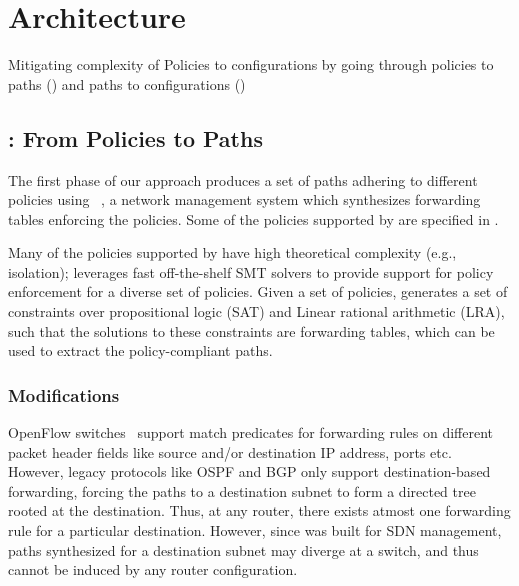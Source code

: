 \section{Architecture} \label{sec:architecture}
Mitigating complexity of Policies to configurations
by going through policies to paths (\genesis) and
paths to configurations (\name)

\subsection{\genesis: From Policies to Paths}
The first phase of our approach produces a set of paths adhering to
different policies using \genesis~\cite{genesis}, a network management
system which synthesizes forwarding tables enforcing the policies. 
Some of the policies supported by \genesis are specified in 
. 

Many of the policies supported by \genesis have high 
theoretical complexity (e.g., isolation); \genesis 
leverages fast off-the-shelf SMT solvers to provide
support for policy enforcement for a diverse set of policies.
Given a set of policies, \genesis generates a set of constraints 
over propositional logic (SAT) and Linear rational arithmetic (LRA),
such that the solutions to these constraints are forwarding
tables, which can be used to extract the 
policy-compliant paths.

\subsubsection{Modifications}
OpenFlow switches~\cite{openflow} support match predicates for
forwarding rules on different packet header fields like source
and/or destination IP address, ports etc. However, legacy protocols
like OSPF and BGP only support destination-based forwarding, 
forcing the paths to a destination subnet to 
form a directed tree rooted at the destination. 
Thus,
at any router, there exists atmost one forwarding rule for a 
particular destination. However, since \genesis was built for
SDN management, paths synthesized for a destination subnet may
diverge at a switch, and thus cannot be induced by any router
configuration. 

